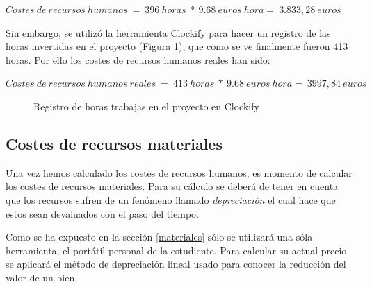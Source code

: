 \begin{center}
$Costes\ de \ recursos \ humanos \ =\ 396\ horas\ *\ 9.68 \ euros\ hora = \ 3.833,28 \ euros$
\end{center}

Sin embargo, se utilizó la herramienta Clockify para hacer un registro de las horas invertidas en el proyecto (Figura \ref{fig:clockify}), que como se ve finalmente fueron 413 horas. Por ello los costes de recursos humanos reales han sido:

\begin{center}
$Costes\ de \ recursos \ humanos \ reales \ =\ 413\ horas\ *\ 9.68 \ euros\ hora = \ 3997,84 \ euros$
\end{center}

\begin{figure}[H]
    \caption{Registro de horas trabajas en el proyecto en Clockify}
    \label{fig:clockify}
\end{figure}

\subsection{Costes de recursos materiales}
Una vez hemos calculado los costes de recursos humanos, es momento de calcular los costes de recursos materiales. Para su cálculo se deberá de tener en cuenta que los recursos sufren de un fenómeno llamado \textit{depreciación} el cual hace que estos sean devaluados con el paso del tiempo. \bigskip

Como se ha expuesto en la sección \ref{materiales} sólo se utilizará una sóla herramienta, el portátil personal de la estudiente. Para calcular su actual precio se aplicará el método de depreciación lineal usado para conocer la reducción del valor de un bien. 

